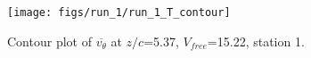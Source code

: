 \begin{figure}[H]
\centering
\texttt{[image: figs/run\_1/run\_1\_T\_contour]}
\caption{Contour plot of $\overline{v_{\theta}}$ at $z/c$=5.37, $V_{free}$=15.22, station 1.}
\label{fig:run_1_T_contour}
\end{figure}


